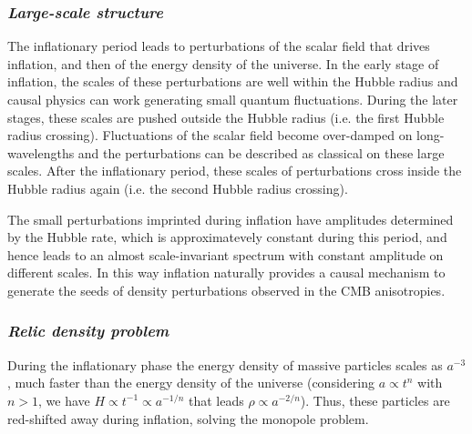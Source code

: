 \documentclass[11pt,a4paper,twoside]{book}
\begin{document}
\subsubsection*{\textit{Large-scale structure}}
The inflationary period leads to perturbations of the scalar field that drives inflation, and then of the energy density of the universe. In the early stage of inflation, the scales of these perturbations are well within the Hubble radius and causal physics can work generating small quantum fluctuations. During the later stages, these scales are pushed outside the Hubble radius (i.e. the first Hubble radius crossing). Fluctuations of the scalar field become over-damped on long-wavelengths and the perturbations can be described as classical on these large scales. After the inflationary period, these scales of perturbations  cross inside the Hubble radius again (i.e. the second Hubble radius crossing).

The small perturbations imprinted during inflation have amplitudes determined by the Hubble rate, which is approximatevely constant during this period, and hence  leads to an almost scale-invariant spectrum with constant amplitude on different scales. In this way  inflation naturally provides a causal mechanism to generate the seeds of density perturbations observed in the CMB anisotropies.

\subsubsection*{\textit{Relic density problem}}
During the inflationary phase the energy density of massive particles scales as $ a^{-3} $, much faster than the energy density  of the universe (considering $ a \propto t^{n} $ with $ n>1 $, we have $ H \propto t^{-1} \propto a^{-1/n}$ that leads $  \rho \propto a^{-2/n} $). Thus, these particles are red-shifted away during inflation, solving the monopole problem.
\end{document}

